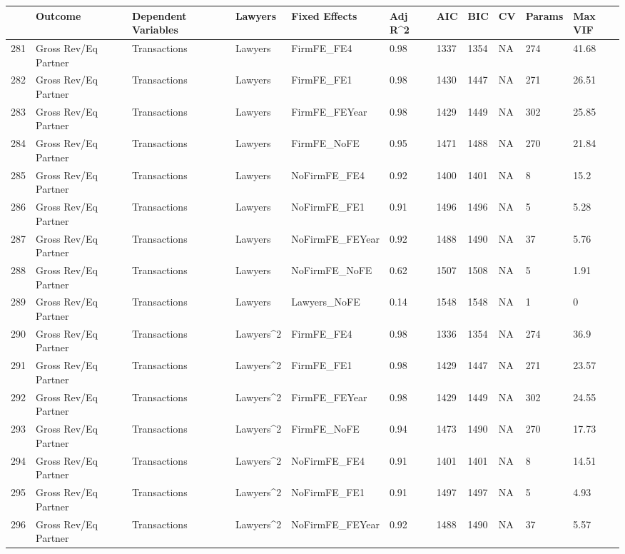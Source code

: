 \documentclass{article}
\begin{document}
\begin{table}[H]
\centering
\begin{tabular}{rllllllllll}
  \hline
 & Outcome & Dependent Variables & Lawyers & Fixed Effects & Adj R^2 & AIC & BIC & CV & Params & Max VIF \\ 
  \hline
281 & Gross Rev/Eq Partner & Transactions & Lawyers & FirmFE\_FE4 & 0.98 & 1337 & 1354 & NA & 274 & 41.68 \\ 
  282 & Gross Rev/Eq Partner & Transactions & Lawyers & FirmFE\_FE1 & 0.98 & 1430 & 1447 & NA & 271 & 26.51 \\ 
  283 & Gross Rev/Eq Partner & Transactions & Lawyers & FirmFE\_FEYear & 0.98 & 1429 & 1449 & NA & 302 & 25.85 \\ 
  284 & Gross Rev/Eq Partner & Transactions & Lawyers & FirmFE\_NoFE & 0.95 & 1471 & 1488 & NA & 270 & 21.84 \\ 
  285 & Gross Rev/Eq Partner & Transactions & Lawyers & NoFirmFE\_FE4 & 0.92 & 1400 & 1401 & NA & 8 & 15.2 \\ 
  286 & Gross Rev/Eq Partner & Transactions & Lawyers & NoFirmFE\_FE1 & 0.91 & 1496 & 1496 & NA & 5 & 5.28 \\ 
  287 & Gross Rev/Eq Partner & Transactions & Lawyers & NoFirmFE\_FEYear & 0.92 & 1488 & 1490 & NA & 37 & 5.76 \\ 
  288 & Gross Rev/Eq Partner & Transactions & Lawyers & NoFirmFE\_NoFE & 0.62 & 1507 & 1508 & NA & 5 & 1.91 \\ 
  289 & Gross Rev/Eq Partner & Transactions & Lawyers & Lawyers\_NoFE & 0.14 & 1548 & 1548 & NA & 1 & 0 \\ 
  290 & Gross Rev/Eq Partner & Transactions & Lawyers^2 & FirmFE\_FE4 & 0.98 & 1336 & 1354 & NA & 274 & 36.9 \\ 
  291 & Gross Rev/Eq Partner & Transactions & Lawyers^2 & FirmFE\_FE1 & 0.98 & 1429 & 1447 & NA & 271 & 23.57 \\ 
  292 & Gross Rev/Eq Partner & Transactions & Lawyers^2 & FirmFE\_FEYear & 0.98 & 1429 & 1449 & NA & 302 & 24.55 \\ 
  293 & Gross Rev/Eq Partner & Transactions & Lawyers^2 & FirmFE\_NoFE & 0.94 & 1473 & 1490 & NA & 270 & 17.73 \\ 
  294 & Gross Rev/Eq Partner & Transactions & Lawyers^2 & NoFirmFE\_FE4 & 0.91 & 1401 & 1401 & NA & 8 & 14.51 \\ 
  295 & Gross Rev/Eq Partner & Transactions & Lawyers^2 & NoFirmFE\_FE1 & 0.91 & 1497 & 1497 & NA & 5 & 4.93 \\ 
  296 & Gross Rev/Eq Partner & Transactions & Lawyers^2 & NoFirmFE\_FEYear & 0.92 & 1488 & 1490 & NA & 37 & 5.57 \\ 

\end{tabular}
\end{table}
\end{document}
